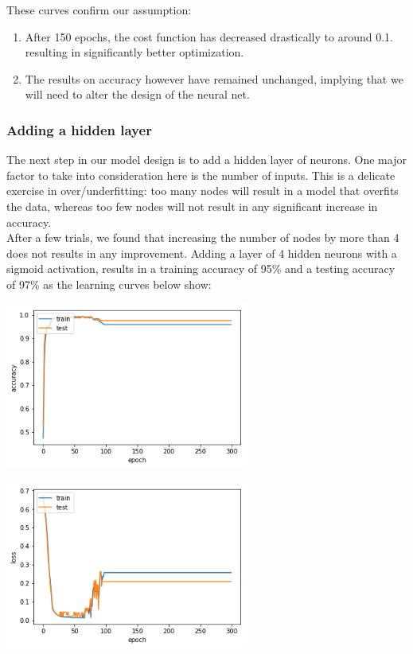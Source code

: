 \documentclass[14pt]{article}
\theoremstyle{plain}
\theoremstyle{definition}
\begin{document}
These curves confirm our assumption:
\begin{enumerate}
\item
After 150 epochs, the cost function has decreased drastically to around 0.1. resulting in significantly better optimization.
\item The results on accuracy however have remained unchanged, implying that we will need to alter the design of the neural net. 
\end{enumerate}

\subsubsection{Adding a hidden layer}\label{final}


 The next step in our model design  is to add a hidden layer of neurons. One major factor to take into consideration here is the number of inputs. This is a delicate exercise in over/underfitting: too many nodes will result in a model that overfits the data, whereas too few nodes will not result in any significant increase in accuracy.\\ 
 After a few trials, we found that increasing the number of nodes by more than 4 does not results in any improvement. Adding a layer of 4 hidden neurons with a sigmoid activation, results in a training accuracy of 95\% and a testing accuracy of 97\% as the learning curves below show:
\newpage 
\begin{table}[ht]
\begin{minipage}[b]{0.3\linewidth}
\centering
\includegraphics[width=80mm]{banknote_forgery_files/hidden1}
\end{minipage}\hfill
\begin{minipage}[b]{0.5\linewidth}
\centering
\includegraphics[width=80mm]{banknote_forgery_files/hidden2}
\end{minipage}
\end{table}
\end{document}
